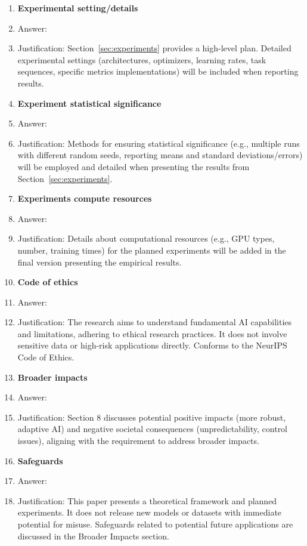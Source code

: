 \documentclass{article}
\begin{document}
\begin{enumerate}
\item {\bf Experimental setting/details}
    \item Answer: \answerNA{} %
    \item Justification: Section~\ref{sec:experiments} provides a high-level plan. Detailed experimental settings (architectures, optimizers, learning rates, task sequences, specific metrics implementations) will be included when reporting results.

\item {\bf Experiment statistical significance}
    \item Answer: \answerNA{} %
    \item Justification: Methods for ensuring statistical significance (e.g., multiple runs with different random seeds, reporting means and standard deviations/errors) will be employed and detailed when presenting the results from Section~\ref{sec:experiments}.

\item {\bf Experiments compute resources}
    \item Answer: \answerNo{}
    \item Justification: Details about computational resources (e.g., GPU types, number, training times) for the planned experiments will be added in the final version presenting the empirical results.

\item {\bf Code of ethics}
    \item Answer: \answerYes{}
    \item Justification: The research aims to understand fundamental AI capabilities and limitations, adhering to ethical research practices. It does not involve sensitive data or high-risk applications directly. Conforms to the NeurIPS Code of Ethics.

\item {\bf Broader impacts}
    \item Answer: \answerYes{}
    \item Justification: Section 8 discusses potential positive impacts (more robust, adaptive AI) and negative societal consequences (unpredictability, control issues), aligning with the requirement to address broader impacts.

\item {\bf Safeguards}
    \item Answer: \answerNA{}
    \item Justification: This paper presents a theoretical framework and planned experiments. It does not release new models or datasets with immediate potential for misuse. Safeguards related to potential future applications are discussed in the Broader Impacts section.


\end{enumerate}
\end{document}
